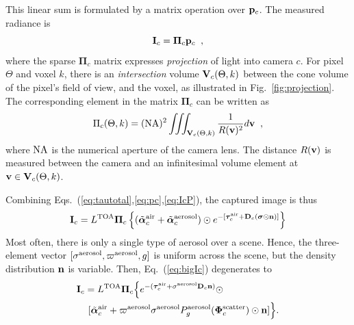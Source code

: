 \documentclass[10pt,twocolumn,letterpaper]{article}
\newcommand{\vect}[1]{\bm{#1}}
\begin{document}
This linear sum is formulated by a matrix operation over ${\bf p}_c$. The measured radiance is
\begin{equation}
 {\bf I}_c= {\vect{\Pi}}_c{\bf p}_c
  \;\;,
  \label{eq:IcP}
\end{equation}
where the sparse ${\vect{\Pi}}_c$ matrix expresses {\em projection} of light into camera $c$.
For pixel $\Theta$ and voxel $k$, there is an {\em intersection} volume ${\bf V}_c(\Theta,k)$ between the cone volume of the pixel's field of view, and the voxel, as illustrated in Fig.~\ref{fig:projection}. The corresponding element in the matrix ${\vect{\Pi}}_c$ can be written as
\begin{equation}
 \Pi_c(\Theta,k)=({\rm NA})^2
     \iiint_{{\bf V}_c(\Theta,k)}
     \frac{1}{R({\bf v})^2} d{\bf v}
  \;\;,
  \label{eq:Pc}
\end{equation}
where ${\rm NA}$ is the numerical aperture of the camera lens. The distance $R({\bf v})$ is measured between the camera and an infinitesimal volume element at ${\bf v}\in {\bf V}_c(\Theta,k)$.

Combining Eqs.~(\ref{eq:tautotal},\ref{eq:pc},\ref{eq:IcP}), the captured image is thus
\begin{align}
 {\bf I}_c= L^{\rm TOA}
    {\vect{\Pi}}_c
          \left\{
          (\tilde{\vect{\alpha}}^{\rm air}_c + \tilde{\vect{\alpha}}^{\rm aerosol}_c)
           \odot
            e^{-[\vect{\tau}_c^{\rm air}
               + {\bf D}_c (\vect{\sigma} \odot {\bf n})]}
           \right\}
  \label{eq:bigIc}
\end{align}
Most often, there is only a single type of aerosol over a scene. Hence, the three-element
vector $[{\sigma}^{\rm aerosol},\varpi^{\rm aerosol},g]$ is uniform across the scene, but the density distribution ${\bf n}$ is variable. Then, Eq.~(\ref{eq:bigIc}) degenerates to
\begin{align}
 {\bf I}_c= L^{\rm TOA}
    {\vect{\Pi}}_c
          \Big\{
            e^{-(\vect{\tau}_c^{\rm air}
                  + {\sigma}^{\rm aerosol} {\bf D}_c {\bf n})
              }\odot
  \;\;\;\;\;\;\;\;\;\;\;\;\;\;\;\;\;\;\;\;\;
     \nonumber \\
           [\tilde{\vect{\alpha}}^{\rm air}_c + %
           \varpi^{\rm aerosol}\sigma^{\rm aerosol}
           P^{\rm aerosol}_g(\vect{\Phi}^{\rm scatter}_c)
           \odot{\bf n}
           ]
           \Big\}
           .
  \label{eq:bigIA}
\end{align}


\end{document}
